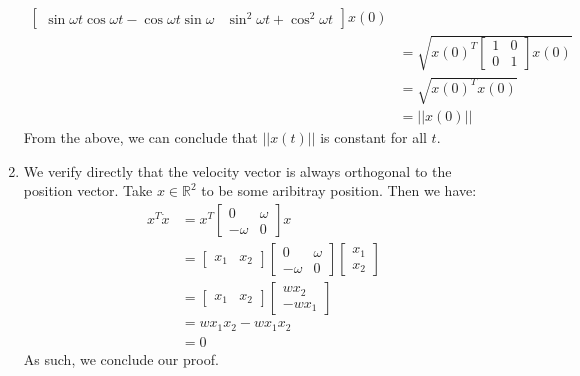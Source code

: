 \documentclass[12pt]{exam}
\begin{document}
\begin{questions}
\begin{solution}
\begin{enumerate}[label=(\alph*)]
\begin{align*}
{\begin{bmatrix}
            \sin \omega t \cos \omega t  -\cos \omega t \sin \omega  & \sin^2 \omega t + \cos^2 \omega t
          \end{bmatrix}
          x(0)} \\
          &= \sqrt{x(0)^T 
          \begin{bmatrix}
            1 & 0 \\
            0 & 1
          \end{bmatrix}
          x(0)} \\
          &= \sqrt{x(0)^Tx(0)} \\
          &= ||x(0)||
        \end{align*}
        From the above, we can conclude that $||x(t)||$ is constant for all $t$.
      \item
        We verify directly that the velocity vector is always orthogonal to the position vector. Take $x \in \mathbb{R}^2$ to be some aribitray position. Then we have:
        \begin{align*}
          x^T\dot{x} &= x^T\begin{bmatrix} 0 & \omega \\ -\omega & 0 \end{bmatrix} x \tag{Given dynamics} \\
          &= \begin{bmatrix} x_1 & x_2 \end{bmatrix} \begin{bmatrix} 0 & \omega \\ -\omega & 0 \end{bmatrix} \begin{bmatrix} x_1 \\ x_2 \end{bmatrix} \\
          &= \begin{bmatrix} x_1 & x_2 \end{bmatrix} \begin{bmatrix} wx_2 \\ -wx_1 \end{bmatrix} \\
          &=  wx_1x_2 - wx_1x_2 \\
          &= 0
        \end{align*}
        As such, we conclude our proof.
    \end{enumerate}
  \end{solution}


\end{questions}
\end{document}
